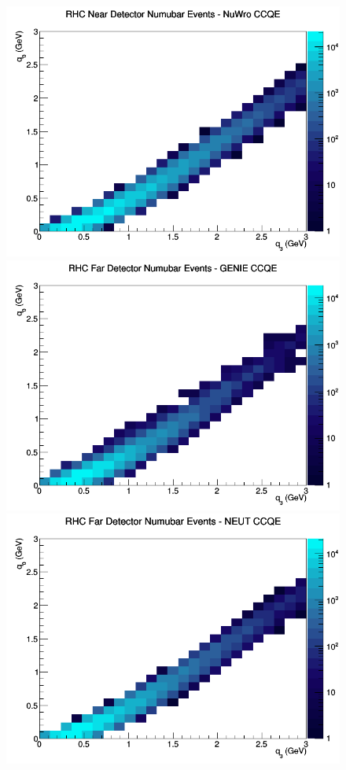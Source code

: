 \begin{figure}[h]
\includegraphics[width=\linewidth]{q0_q3/nominal/CCQE_RHC_ND_numubar_q3_q0_NuWro.png}
\endminipage
\newline
{}
\includegraphics[width=\linewidth]{q0_q3/nominal/CCQE_RHC_FD_numubar_q3_q0_GENIE.png}
\endminipage
{}
\includegraphics[width=\linewidth]{q0_q3/nominal/CCQE_RHC_FD_numubar_q3_q0_NEUT.png}

\end{figure}

